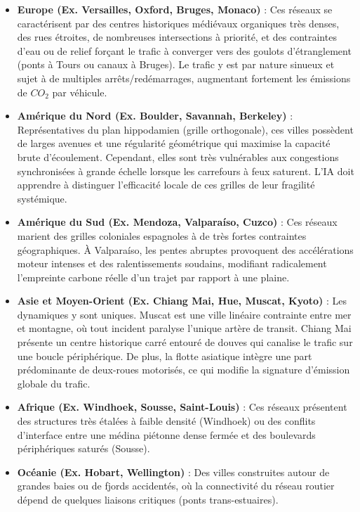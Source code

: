 \documentclass[10pt, a4paper]{article}
\providecommand{\tightlist}{}
\begin{document}
\begin{itemize}
\tightlist
\item
  \textbf{Europe (Ex. Versailles, Oxford, Bruges, Monaco)} : Ces réseaux
  se caractérisent par des centres historiques médiévaux organiques très
  denses, des rues étroites, de nombreuses intersections à priorité, et
  des contraintes d'eau ou de relief forçant le trafic à converger vers
  des goulots d'étranglement (ponts à Tours ou canaux à Bruges). Le
  trafic y est par nature sinueux et sujet à de multiples
  arrêts/redémarrages, augmentant fortement les émissions de \(CO_2\)
  par véhicule.
\item
  \textbf{Amérique du Nord (Ex. Boulder, Savannah, Berkeley)} :
  Représentatives du plan hippodamien (grille orthogonale), ces villes
  possèdent de larges avenues et une régularité géométrique qui maximise
  la capacité brute d'écoulement. Cependant, elles sont très vulnérables
  aux congestions synchronisées à grande échelle lorsque les carrefours
  à feux saturent. L'IA doit apprendre à distinguer l'efficacité locale
  de ces grilles de leur fragilité systémique.
\item
  \textbf{Amérique du Sud (Ex. Mendoza, Valparaíso, Cuzco)} : Ces
  réseaux marient des grilles coloniales espagnoles à de très fortes
  contraintes géographiques. À Valparaíso, les pentes abruptes
  provoquent des accélérations moteur intenses et des ralentissements
  soudains, modifiant radicalement l'empreinte carbone réelle d'un
  trajet par rapport à une plaine.
\item
  \textbf{Asie et Moyen-Orient (Ex. Chiang Mai, Hue, Muscat, Kyoto)} :
  Les dynamiques y sont uniques. Muscat est une ville linéaire
  contrainte entre mer et montagne, où tout incident paralyse l'unique
  artère de transit. Chiang Mai présente un centre historique carré
  entouré de douves qui canalise le trafic sur une boucle périphérique.
  De plus, la flotte asiatique intègre une part prédominante de
  deux-roues motorisés, ce qui modifie la signature d'émission globale
  du trafic.
\item
  \textbf{Afrique (Ex. Windhoek, Sousse, Saint-Louis)} : Ces réseaux
  présentent des structures très étalées à faible densité (Windhoek) ou
  des conflits d'interface entre une médina piétonne dense fermée et des
  boulevards périphériques saturés (Sousse).
\item
  \textbf{Océanie (Ex. Hobart, Wellington)} : Des villes construites
  autour de grandes baies ou de fjords accidentés, où la connectivité du
  réseau routier dépend de quelques liaisons critiques (ponts
  trans-estuaires).
\end{itemize}
\end{document}
